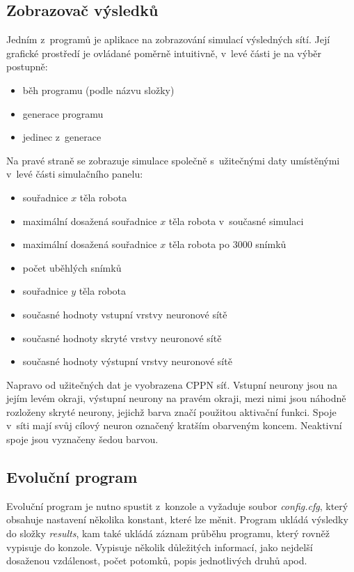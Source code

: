 \documentclass[a4]{article}
\begin{document}
\subsection{Zobrazovač výsledků}
Jedním z~programů je aplikace na zobrazování simulací výsledných sítí. Její grafické prostředí je ovládané poměrně intuitivně, v~levé části je na výběr postupně:
\begin{itemize}
\item{běh programu (podle názvu složky)}
\item{generace programu}
\item{jedinec z~generace}
\end{itemize}
Na pravé straně se zobrazuje simulace společně s~užitečnými daty umístěnými v~levé části simulačního panelu:
\begin{itemize}
\item{souřadnice $x$ těla robota}
\item{maximální dosažená souřadnice $x$ těla robota v~současné simulaci}
\item{maximální dosažená souřadnice $x$ těla robota po 3000 snímků}
\item{počet uběhlých snímků}
\item{souřadnice $y$ těla robota}
\item{současné hodnoty vstupní vrstvy neuronové sítě}
\item{současné hodnoty skryté vrstvy neuronové sítě}
\item{současné hodnoty výstupní vrstvy neuronové sítě}
\end{itemize}
Napravo od užitečných dat je vyobrazena CPPN síť. Vstupní neurony jsou na jejím levém okraji, výstupní neurony na pravém okraji, mezi nimi jsou náhodně rozloženy skryté neurony, jejichž barva značí použitou aktivační funkci. Spoje v~síti mají svůj cílový neuron označený kratším obarveným koncem. Neaktivní spoje jsou vyznačeny šedou barvou.
\subsection{Evoluční program}
Evoluční program je nutno spustit z~konzole a vyžaduje soubor \emph{config.cfg}, který obsahuje nastavení několika konstant, které lze měnit. Program ukládá výsledky do složky \emph{results}, kam také ukládá záznam průběhu programu, který rovněž vypisuje do konzole. Vypisuje několik důležitých informací, jako nejdelší dosaženou vzdálenost, počet potomků, popis jednotlivých druhů apod.
\end{document}
